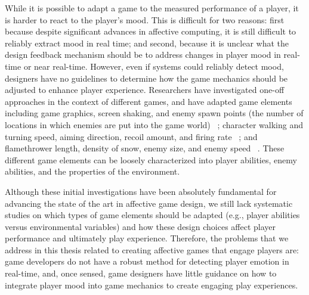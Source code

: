 While it is possible to adapt a game to the measured performance of a player, it is harder to react to the player’s mood. This is difficult for two reasons: first because despite significant advances in affective computing, it is still difficult to reliably extract mood in real time; and second, because it is unclear what the design feedback mechanism should be to address changes in player mood in real-time or near real-time. However, even if systems could reliably detect mood, designers have no guidelines to determine how the game mechanics should be adjusted to enhance player experience. Researchers have investigated one-off approaches in the context of different games, and have adapted game elements including game graphics, screen shaking, and enemy spawn points (the number of locations in which enemies are put into the game world) ~\cite{dekker2007please}; character walking and turning speed, aiming direction, recoil amount, and firing rate ~\cite{epp2011identifying}; and flamethrower length, density of snow, enemy size, and enemy speed ~\cite{nacke2011biofeedback}. These different game elements can be loosely characterized into player abilities, enemy abilities, and the properties of the environment.

Although these initial investigations have been absolutely fundamental for advancing the state of the art in affective game design, we still lack systematic studies on which types of game elements should be adapted (e.g., player abilities versus environmental variables) and how these design choices affect player performance and ultimately play experience. Therefore, the problems that we address in this thesis related to creating affective games that engage players are: game developers do not have a robust method for detecting player emotion in real-time, and, once sensed, game designers have little guidance on how to integrate player mood into game mechanics to create engaging play experiences.

